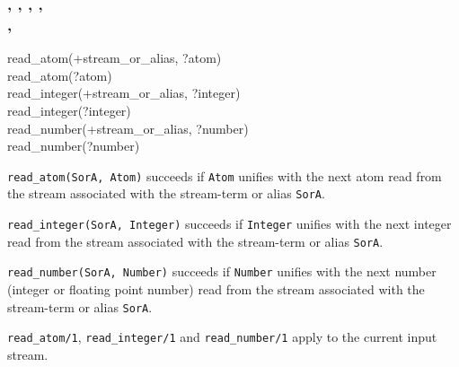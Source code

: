 \subsubsection{,\label{read-atom/2}
               ,
               ,
               , \\
               ,
               }


\begin{TemplatesOneCol}
read\_atom(+stream\_or\_alias, ?atom)\\
read\_atom(?atom)\\
read\_integer(+stream\_or\_alias, ?integer)\\
read\_integer(?integer)\\
read\_number(+stream\_or\_alias, ?number)\\
read\_number(?number)

\end{TemplatesOneCol}

\Description

\texttt{read\_atom(SorA, Atom)} succeeds if \texttt{Atom}
unifies with the next atom read from the stream associated with the
stream-term or alias \texttt{SorA}.

\texttt{read\_integer(SorA, Integer)} succeeds if
\texttt{Integer} unifies with the next integer read from the stream
associated with the stream-term or alias \texttt{SorA}.

\texttt{read\_number(SorA, Number)} succeeds if
\texttt{Number} unifies with the next number (integer or floating point
number) read from the stream associated with the stream-term or alias
\texttt{SorA}.

\texttt{read\_atom/1}, \texttt{read\_integer/1} and \texttt{read\_number/1}
apply to the current input stream.


